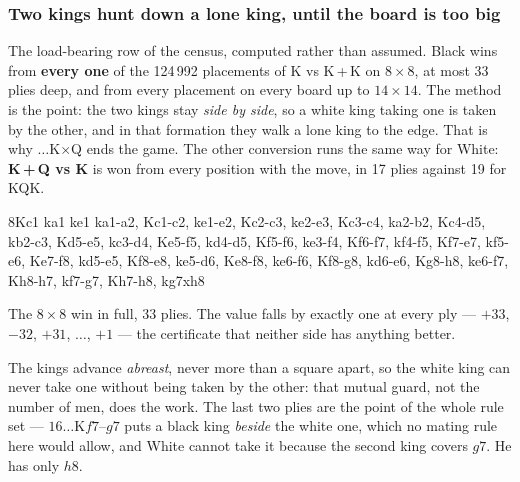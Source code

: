 \documentclass[10pt]{article}
\begin{document}
\subsubsection{Two kings hunt down a lone king, until the board is too big}\label{sub:cap-hunt}

\noindent
The load-bearing row of the census, computed rather than assumed. Black wins
from \textbf{every one} of the 124\,992 placements of K vs K\,+\,K on
$8\times8$, at most 33 plies deep, and from every placement on every board up
to $14\times14$. The method is the point: the two kings stay \emph{side by
side}, so a white king taking one is taken by the other, and in that formation
they walk a lone king to the edge. That is why $\ldots$K$\times$Q ends the
game. The other conversion runs the same way for White: \textbf{K\,+\,Q vs K}
is won from every position with the move, in 17 plies against 19 for KQK.

\medskip
\noindent
\begin{minipage}[t]{0.36\textwidth}
\begin{stepboard}[width=\linewidth,board=3.44cm,height=51mm,variant=C,
  intro={\textbf{K vs K+K}, Black to move --- the white king falls in 17
  moves}]{8}{Kc1 ka1 ke1}
  ka1-a2, Kc1-c2, ke1-e2, Kc2-c3, ke2-e3, Kc3-c4, ka2-b2, Kc4-d5,
  kb2-c3, Kd5-e5, kc3-d4, Ke5-f5, kd4-d5, Kf5-f6, ke3-f4, Kf6-f7,
  kf4-f5, Kf7-e7, kf5-e6, Ke7-f8, kd5-e5, Kf8-e8, ke5-d6, Ke8-f8,
  ke6-f6, Kf8-g8, kd6-e6, Kg8-h8, ke6-f7, Kh8-h7, kf7-g7, Kh7-h8, kg7xh8
\end{stepboard}
\end{minipage}\hfill
\begin{minipage}[t]{0.60\textwidth}\vspace{0pt}\small
The $8\times8$ win in full, 33 plies. The value falls by exactly one at every
ply --- $+33$, $-32$, $+31$, $\ldots$, $+1$ --- the certificate that neither
side has anything better.

\smallskip
The kings advance \emph{abreast}, never more than a square apart, so the white
king can never take one without being taken by the other: that mutual guard,
not the number of men, does the work. The last two plies are the point of the
whole rule set --- $16\ldots$K$f7$--$g7$ puts a black king \emph{beside} the
white one, which no mating rule here would allow, and White cannot take it
because the second king covers $g7$. He has only $h8$.
\end{minipage}
\end{document}
